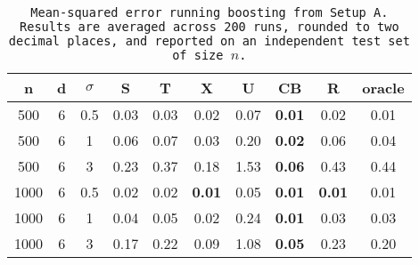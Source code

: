\begin{table}[ht]
\centering
\begin{tabular}{cccccccccc}
  \hline
n & d & $\sigma$ & S & T & X & U & CB & R & oracle \\ 
  \hline
500 & 6 & 0.5 & 0.03 & 0.03 & 0.02 & 0.07 & \bf 0.01 & 0.02 & 0.01 \\ 
  500 & 6 & 1 & 0.06 & 0.07 & 0.03 & 0.20 & \bf 0.02 & 0.06 & 0.04 \\ 
  500 & 6 & 3 & 0.23 & 0.37 & 0.18 & 1.53 & \bf 0.06 & 0.43 & 0.44 \\ 
  1000 & 6 & 0.5 & 0.02 & 0.02 & \bf 0.01 & 0.05 & \bf 0.01 & \bf 0.01 & 0.01 \\ 
  1000 & 6 & 1 & 0.04 & 0.05 & 0.02 & 0.24 & \bf 0.01 & 0.03 & 0.03 \\ 
  1000 & 6 & 3 & 0.17 & 0.22 & 0.09 & 1.08 & \bf 0.05 & 0.23 & 0.20 \\ 
   \hline
\end{tabular}
\caption{\tt Mean-squared error running \texttt{boosting} from Setup A. Results are averaged across 200 runs, rounded to two decimal places, and reported on an independent test set of size $n$.} 
\label{table:setup1}
\end{table}
